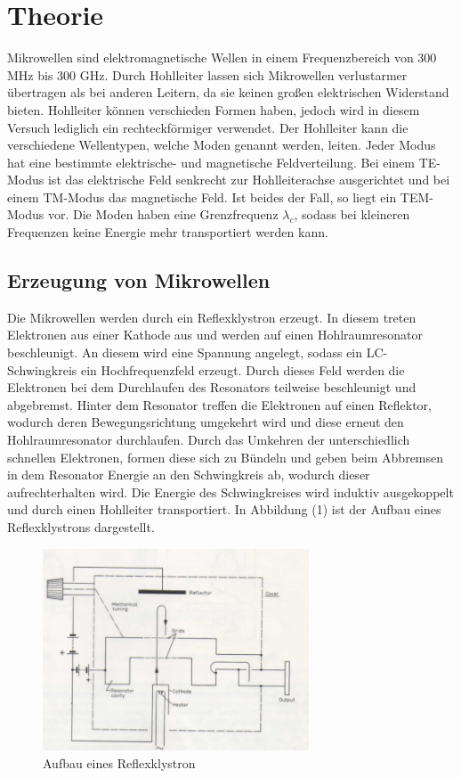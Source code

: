 \section{Theorie}
\label{sec:Theorie}
Mikrowellen sind elektromagnetische Wellen in einem Frequenzbereich von $300$ MHz bis 300 GHz. Durch
Hohlleiter lassen sich Mikrowellen verlustarmer übertragen als bei anderen Leitern, da
sie keinen großen elektrischen Widerstand bieten. Hohlleiter können verschieden Formen haben,
jedoch wird in diesem Versuch lediglich ein rechteckförmiger verwendet. Der Hohlleiter
kann die verschiedene Wellentypen, welche Moden genannt werden, leiten. Jeder Modus hat
eine bestimmte elektrische- und magnetische Feldverteilung. Bei einem TE-Modus ist das elektrische
Feld senkrecht zur Hohlleiterachse ausgerichtet und bei einem TM-Modus das magnetische Feld.
Ist beides der Fall, so liegt ein TEM-Modus vor. Die Moden haben eine Grenzfrequenz $\lambda_c$, sodass
bei kleineren Frequenzen keine Energie mehr transportiert werden kann.

\subsection{Erzeugung von Mikrowellen}
Die Mikrowellen werden durch ein Reflexklystron erzeugt. In diesem treten Elektronen
aus einer Kathode aus und werden auf einen Hohlraumresonator beschleunigt. An diesem
wird eine Spannung angelegt, sodass ein LC-Schwingkreis ein Hochfrequenzfeld erzeugt.
Durch dieses Feld werden die Elektronen  bei dem Durchlaufen des Resonators teilweise beschleunigt und abgebremst.
Hinter dem Resonator treffen die Elektronen auf einen Reflektor, wodurch deren
Bewegungsrichtung umgekehrt wird und diese erneut den Hohlraumresonator durchlaufen.
Durch das Umkehren der unterschiedlich schnellen Elektronen, formen diese sich zu Bündeln und
geben beim Abbremsen in dem Resonator Energie an den Schwingkreis ab, wodurch dieser
aufrechterhalten wird. Die Energie des Schwingkreises wird induktiv ausgekoppelt und
durch einen Hohlleiter transportiert. In Abbildung (1) ist der Aufbau
eines Reflexklystrons dargestellt.

\begin{figure}[H]
  \centering
  \includegraphics[height=6cm]{klystron.PNG}
  \caption{Aufbau eines Reflexklystron \cite{sample1}}
  \label{fig:Lock}
\end{figure}

